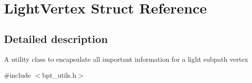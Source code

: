 \hypertarget{struct_light_vertex}{}\section{Light\+Vertex Struct Reference}
\label{struct_light_vertex}


\subsection{Detailed description}
\begin{DoxyParagraph}{}
A utility class to encapsulate all important information for a light subpath vertex 
\end{DoxyParagraph}


{\ttfamily \#include $<$bpt\+\_\+utils.\+h$>$}

